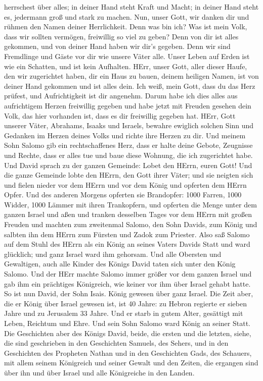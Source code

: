 herrschest über alles; in deiner Hand steht Kraft und Macht; in deiner
Hand steht es, jedermann groß und stark zu machen.  Nun,
unser Gott, wir danken dir und rühmen den Namen deiner Herrlichkeit.
 Denn was bin ich? Was ist mein Volk, dass wir sollten
vermögen, freiwillig so viel zu geben? Denn von dir ist alles gekommen,
und von deiner Hand haben wir dir's gegeben.  Denn wir sind
Fremdlinge und Gäste vor dir wie unsere Väter alle. Unser Leben auf
Erden ist wie ein Schatten, und ist kein Aufhalten.  HErr,
unser Gott, aller dieser Haufe, den wir zugerichtet haben, dir ein Haus
zu bauen, deinem heiligen Namen, ist von deiner Hand gekommen und ist
alles dein.  Ich weiß, mein Gott, dass du das Herz prüfest,
und Aufrichtigkeit ist dir angenehm. Darum habe ich dies alles aus
aufrichtigem Herzen freiwillig gegeben und habe jetzt mit Freuden
gesehen dein Volk, das hier vorhanden ist, dass es dir freiwillig
gegeben hat.  HErr, Gott unserer Väter, Abrahams, Isaaks
und Israels, bewahre ewiglich solchen Sinn und Gedanken im Herzen deines
Volks und richte ihre Herzen zu dir.  Und meinem Sohn
Salomo gib ein rechtschaffenes Herz, dass er halte deine Gebote,
Zeugnisse und Rechte, dass er alles tue und baue diese Wohnung, die ich
zugerichtet habe.  Und David sprach zu der ganzen Gemeinde:
Lobet den HErrn, euren Gott! Und die ganze Gemeinde lobte den HErrn, den
Gott ihrer Väter; und sie neigten sich und fielen nieder vor dem HErrn
und vor dem König  und opferten dem HErrn Opfer. Und des
anderen Morgens opferten sie Brandopfer: 1000 Farren, 1000 Widder, 1000
Lämmer mit ihren Trankopfern, und opferten die Menge unter dem ganzen
Israel  und aßen und tranken desselben Tages vor dem HErrn
mit großen Freuden und machten zum zweitenmal Salomo, den Sohn Davids,
zum König und salbten ihn dem HErrn zum Fürsten und Zadok zum Priester.
 Also saß Salomo auf dem Stuhl des HErrn als ein König an
seines Vaters Davids Statt und ward glücklich; und ganz Israel ward ihm
gehorsam.  Und alle Obersten und Gewaltigen, auch alle
Kinder des Königs David taten sich unter den König Salomo. 
Und der HErr machte Salomo immer größer vor dem ganzen Israel und gab
ihm ein prächtiges Königreich, wie keiner vor ihm über Israel gehabt
hatte.  So ist nun David, der Sohn Isais. König gewesen
über ganz Israel.  Die Zeit aber, die er König über Israel
gewesen ist, ist 40 Jahre: zu Hebron regierte er sieben Jahre und zu
Jerusalem 33 Jahre.  Und er starb in gutem Alter, gesättigt
mit Leben, Reichtum und Ehre. Und sein Sohn Salomo ward König an seiner
Statt.  Die Geschichten aber des Königs David, beide, die
ersten und die letzten, siehe, die sind geschrieben in den Geschichten
Samuels, des Sehers, und in den Geschichten des Propheten Nathan und in
den Geschichten Gads, des Schauers,  mit allem seinem
Königreich und seiner Gewalt und den Zeiten, die ergangen sind über ihn
und über Israel und alle Königreiche in den Landen.
